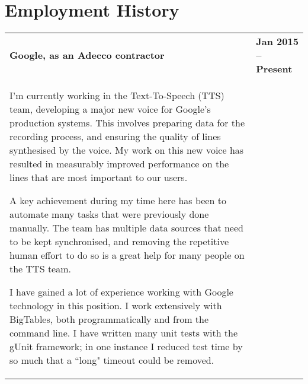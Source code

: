 \documentclass[]{article}
\begin{document}
\section*{Employment History}
\setlength{\tabcolsep}{0.1cm}
\begin{table*}[h!]
\begin{tabular}[h!]{p{12.7cm}l}

\textbf{Google, as an Adecco contractor} & \textbf{Jan 2015 -- Present}\\

\vspace{0.05cm}
\hspace{0.5cm} I'm currently working in the Text-To-Speech (TTS) team, developing a major new voice for Google's production systems. This involves preparing data for the recording process, and ensuring the quality of lines synthesised by the voice. My work on this new voice has resulted in measurably improved performance on the lines that are most important to our users.

\hspace{0.5cm} A key achievement during my time here has been to automate many tasks that were previously done manually. The team has multiple data sources that need to be kept synchronised, and removing the repetitive human effort to do so is a great help for many people on the TTS team.

\hspace{0.5cm} I have gained a lot of experience working with Google technology in this position. I work extensively with BigTables, both programmatically and from the command line. I have written many unit tests with the gUnit framework; in one instance I reduced test time by so much that a ``long" timeout could be removed.



& \\


\end{tabular}
\end{table*}
\end{document}
